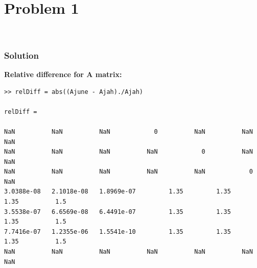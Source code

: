 \documentclass[conf]{new-aiaa}
\begin{document}
\section*{Problem 1}

\begin{center}
 \\
\end{center}

\subsubsection*{Solution} 

\textbf{Relative difference for A matrix:}
\begin{lstlisting}
>> relDiff = abs((Ajune - Ajah)./Ajah)

relDiff =

NaN          NaN          NaN            0          NaN          NaN          NaN
NaN          NaN          NaN          NaN            0          NaN          NaN
NaN          NaN          NaN          NaN          NaN            0          NaN
3.0388e-08   2.1018e-08   1.8969e-07         1.35         1.35         1.35          1.5
3.5538e-07   6.6569e-08   6.4491e-07         1.35         1.35         1.35          1.5
7.7416e-07   1.2355e-06   1.5541e-10         1.35         1.35         1.35          1.5
NaN          NaN          NaN          NaN          NaN          NaN          NaN

\end{lstlisting}
\end{document}
